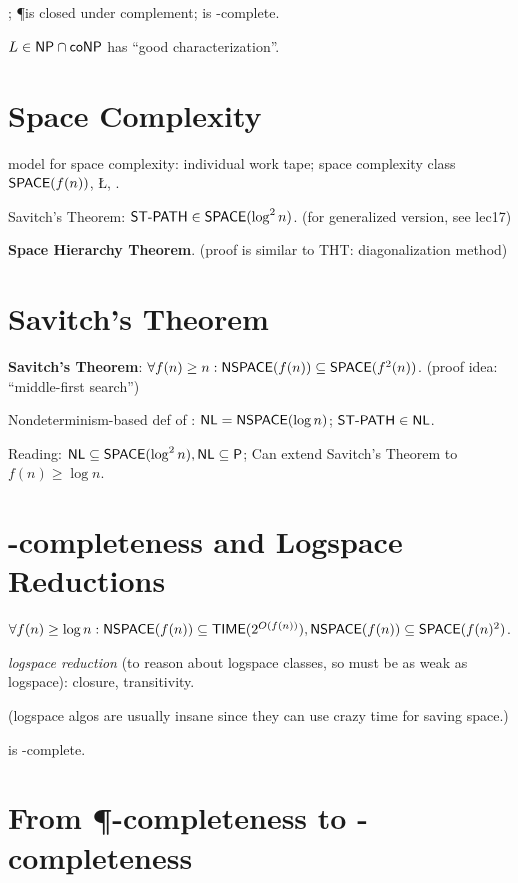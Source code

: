 \documentclass{article}
\begin{document}
\section{\coNP}

\coNP;
\P is closed under complement;
 is \coNP-complete.
\par
$L \in \text{\sf NP} \cap \text{\sf coNP}$ has ``good characterization''.


\section{Space Complexity}

model for space complexity: individual work tape;
space complexity class $\text{\sf SPACE}(f(n))$, \L, \PSPACE.
\par
Savitch's Theorem: $\text{\sf ST-PATH} \in \text{\sf SPACE}(\log^2 n)$. (for generalized version, see lec17)
\par
\textbf{Space Hierarchy Theorem}. (proof is similar to THT: diagonalization method)


\section{Savitch's Theorem}

\textbf{Savitch's Theorem}: $\forall f(n) \geq n: \text{\sf NSPACE}(f(n)) \subseteq \text{\sf SPACE}(f^2(n))$.
(proof idea: ``middle-first search'')
\par
Nondeterminism-based def of \NL: $\text{\sf NL} = \text{\sf NSPACE}(\log n)$;
$\text{\sf ST-PATH} \in \text{\sf NL}$.
\par
Reading:
$\text{\sf NL} \subseteq \text{\sf SPACE}(\log^2 n), \text{\sf NL} \subseteq \text{\sf P}$;
Can extend Savitch's Theorem to $f(n) \geq \log n$.


\section{\NL-completeness and Logspace Reductions}

$\forall f(n) \geq \log n: \text{\sf NSPACE}(f(n)) \subseteq \text{\sf TIME}(2^{O(f(n))}), \text{\sf NSPACE}(f(n)) \subseteq \text{\sf SPACE}(f(n)^2)$.
\par
\textit{logspace reduction} (to reason about logspace classes, so must be as weak as logspace): closure, transitivity.
\par
(logspace algos are usually insane since they can use crazy time for saving space.)
\par
{} is \NL-complete.


\section{From \P-completeness to \PSPACE-completeness}
\end{document}
